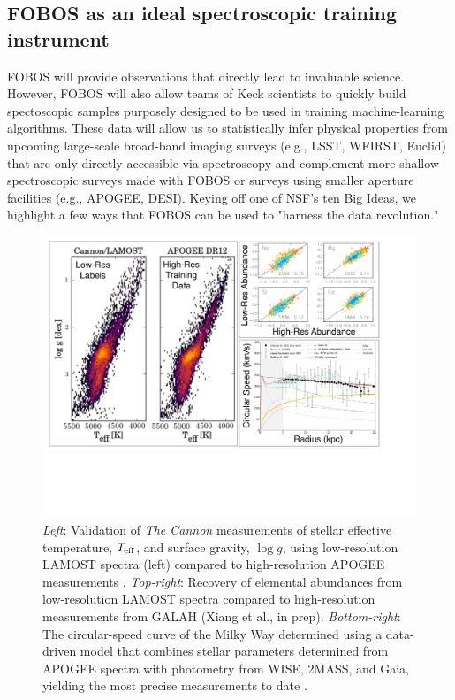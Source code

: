 
\subsection{FOBOS as an ideal spectroscopic training instrument}
\label{sec:datascience}

FOBOS will provide observations that directly lead to invaluable
science. However, FOBOS will also allow teams of Keck scientists to
quickly build spectoscopic samples purposely designed to be used in
training machine-learning algorithms. These data will allow us to
statistically infer physical properties from upcoming large-scale
broad-band imaging surveys (e.g., LSST, WFIRST, Euclid) that are only
directly accessible via spectroscopy and complement more shallow
spectroscopic surveys made with FOBOS or surveys using smaller
aperture facilities (e.g., APOGEE, DESI). Keying off one of NSF's ten
Big Ideas, we highlight a few ways that FOBOS can be used to "harness
the data revolution."


\begin{figure}[h!]
%
\vskip -0.1in
%
\includegraphics[width=\textwidth]{figs/LGplots.pdf}
%
\caption{{\it Left}: Validation of {\it The Cannon} measurements of
stellar effective temperature, $T_{\rm eff}$, and surface gravity, $\log
g$, using low-resolution LAMOST spectra (left) compared to
high-resolution APOGEE measurements
\citep[right;][]{2017ApJ...836....5H}. {\it Top-right}: Recovery of
elemental abundances from low-resolution LAMOST spectra compared to
high-resolution measurements from GALAH (Xiang et al., in prep).  {\it
Bottom-right}: The circular-speed curve of the Milky Way determined
using a data-driven model that combines stellar parameters determined
from APOGEE spectra with photometry from WISE, 2MASS, and Gaia, yielding
the most precise measurements to date \citep{2019ApJ...871..120E}.}
%
\label{fig:Cannon}
%
\end{figure}


